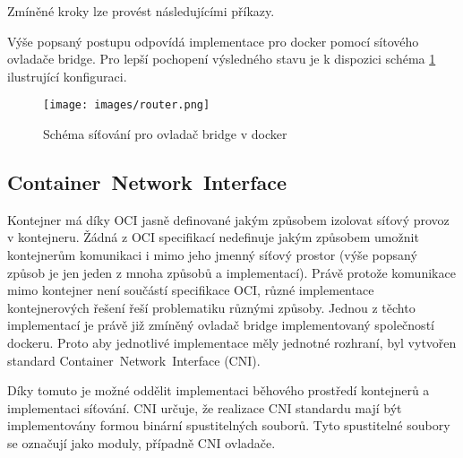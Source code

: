 Zmíněné kroky lze provést následujícími příkazy.



Výše popsaný postupu odpovídá implementace pro docker pomocí sítového ovladače bridge. Pro lepší pochopení výsledného stavu je k dispozici schéma \ref{img:ContainerNetworking} ilustrující konfiguraci.

\begin{figure}[ht]
\centering
\texttt{[image: images/router.png]}
\caption[Schéma síťování pro ovladač bridge v docker]{Schéma síťování pro ovladač bridge v docker \cite{velichko_2020_connecting}}\label{img:ContainerNetworking}
\end{figure}

\subsection{Container~Network~Interface}\label{cni}
Kontejner má díky OCI jasně definované jakým způsobem izolovat síťový provoz v kontejneru. Žádná z OCI specifikací nedefinuje jakým způsobem umožnit kontejnerům komunikaci i mimo jeho jmenný síťový prostor (výše popsaný způsob je jen jeden z mnoha způsobů a implementací). Právě protože komunikace mimo kontejner není součástí specifikace OCI, různé implementace kontejnerových řešení řeší problematiku různými způsoby. Jednou z těchto implementací je právě již zmíněný ovladač bridge implementovaný společností dockeru. Proto aby jednotlivé implementace měly jednotné rozhraní, byl vytvořen standard Container~Network~Interface (CNI).

Díky tomuto je možné oddělit implementaci běhového prostředí kontejnerů a implementaci síťování. CNI určuje, že realizace CNI standardu mají být implementovány formou binární spustitelných souborů. Tyto spustitelné soubory se označují jako moduly, případně CNI ovladače.


